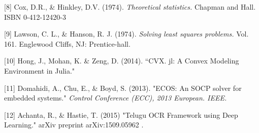\documentclass[12pt]{article}
\begin{document}
[8] Cox, D.R., \& Hinkley, D.V. (1974). \emph{Theoretical statistics.} Chapman and Hall. ISBN 0-412-12420-3

[9] Lawson, C. L., \& Hanson, R. J. (1974). \emph{Solving least squares problems.} Vol. 161. Englewood Cliffs, NJ: Prentice-hall.

[10] Hong, J., Mohan, K. \& Zeng, D. (2014). ``CVX. jl: A Convex Modeling Environment in Julia."

[11] Domahidi, A., Chu, E., \& Boyd, S. (2013). "ECOS: An SOCP solver for embedded systems." \emph{Control Conference (ECC), 2013 European. IEEE.}

[12] Achanta, R., \& Hastie, T. (2015) "Telugu OCR Framework using Deep Learning." arXiv preprint arXiv:1509.05962 .
\end{document}
